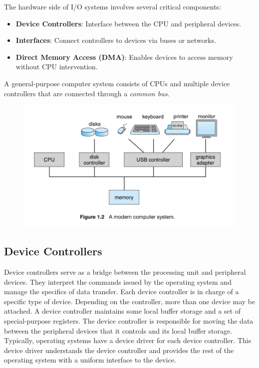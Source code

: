 \documentclass[a4paper]{article}
\begin{document}
The hardware side of I/O systems involves several critical components:

\begin{itemize}
    \item \textbf{Device Controllers}: Interface between the CPU and peripheral devices.
    \item \textbf{Interfaces}: Connect controllers to devices via buses or networks.
    \item \textbf{Direct Memory Access (DMA)}: Enables devices to access memory without CPU intervention.
\end{itemize}
A general-purpose computer system consists of CPUs and multiple device
controllers that are connected through a \textit{common bus}.

\begin{figure}[H]
    \centering
    \includegraphics[width=1\textwidth]{Amod.png}
\end{figure}

\subsection{Device Controllers}

Device controllers serve as a bridge between the processing unit and peripheral devices. They interpret the commands issued by 
the operating system and manage the specifics of data transfer. Each device controller
is in charge of a specific type of device. Depending on the controller, more
than one device may be attached.  A device controller maintains some local buffer storage and a set of special-purpose
registers. The device controller is responsible for moving the data between
the peripheral devices that it controls and its local buffer storage. Typically,
operating systems have a device driver for each device controller. This device
driver understands the device controller and provides the rest of the operating
system with a uniform interface to the device.
\\
\vspace{1em}
\end{document}
